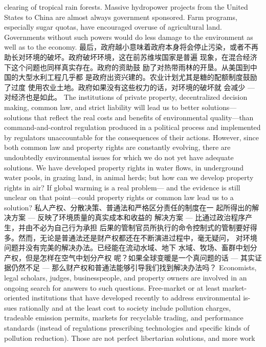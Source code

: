 \begin{paracol}{2}
clearing of tropical rain forests. Massive hydropower projects
from the United States to China are almost always government
sponsored. Farm programs, especially sugar quotas, have encouraged overuse of agricultural land. Governments without
such powers would do less damage to the environment as well
as to the economy.
\switchcolumn
最后，政府越小意味着政府本身将会停止污染，或者不再
助长对环境的破坏。政府破坏环境，这在前苏维埃国家是普遍
现象，在混合经济下这个问题也同样真实存在。政府的资助鼓
励了对热带雨林的开垦。从美国到中国的大型水利工程几乎都
是政府出资兴建的。农业计划尤其是糖的配额制度鼓励了过度
使用农业土地。政府如果没有这些权力的话，对环境的破坏就
会减少 --- 对经济也是如此。
\switchcolumn*
The institutions of private property, decentralized decision
making, common law, and strict liability will lead us to better
solutions---solutions that reflect the real costs and benefits of
environmental quality---than command-and-control regulation produced in a political process and implemented by regulators unaccountable for the consequences of their actions.
However, since both common law and property rights are constantly evolving, there are undoubtedly environmental issues
for which we do not yet have adequate solutions. We have developed property rights in water flows, in underground water
pools, in grazing land, in animal herds; but how can we develop
property rights in air? If global warming is a real problem---
and the evidence is still unclear on that point---could property
rights or common law lead us to a solution?
\switchcolumn
私人产权、分散决策、普通法和严格区分责任的制度在一
起所得出的解决方案 --- 反映了环境质量的真实成本和收益的
解决方案 --- 比通过政治程序产生，并由不必为自己行为承担
后果的管制官员所执行的命令控制式的管制要好得多。然而，无论是普通法还是财产权都还在不断演进过程中，毫无疑问，
对环境问题并没有完美的解决办法。已经能在流动水域、地下
水域、牧场、畜群中划分产权，但是怎样在空气中划分产权
呢？如果全球变暖是一个真问题的话 --- 其实证据仍然不足
--- 那么财产权和普通法能够引导我们找到解决办法吗？
\switchcolumn*
Economists, legal scholars, judges, businesspeople, and property owners are involved in an ongoing search for answers to
such questions. Free-market or at least market-oriented institutions that have developed recently to address environmental is-
sues rationally and at the least cost to society include pollution
charges, tradeable emission permits, markets for recyclable
trading, and performance standards (instead of regulations prescribing technologies and specific kinds of pollution reduction).
Those are not perfect libertarian solutions, and more work

\end{paracol}
